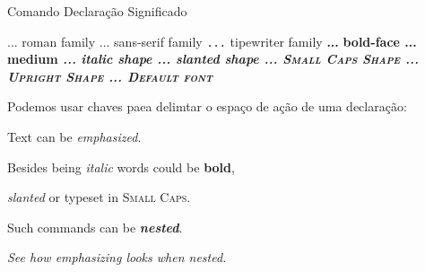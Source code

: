 \documentclass{article}
\begin{document}
Comando         Declaração  Significado

\textrm{...}    \rmfamily   roman family
\textsf{...}    \sffamily   sans-serif family
\texttt{...}    \ttfamily   tipewriter family
\textbf{...}    \bfseries   bold-face
\textmd{...}    \mdseries   medium
\textit{...}    \itshape    italic shape
\textsl{...}    \slshape    slanted shape
\textsc{...}    \scshape    Small Caps Shape
\textup{...}    \upshape    Upright Shape
\textnormal{...}    \normalfont Default font


Podemos usar chaves paea delimtar o espaço de ação
de uma declaração:

{\sffamily

Text can be {\em emphasized}.

Besides being {\itshape italic} words could be {\bfseries bold},

{\slshape slanted} or typeset in {\scshape Small Caps}.

Such commands can be {\itshape\bfseries nested}.}

{\em See how {\em emphasizing} looks when nested.}
\end{document}
